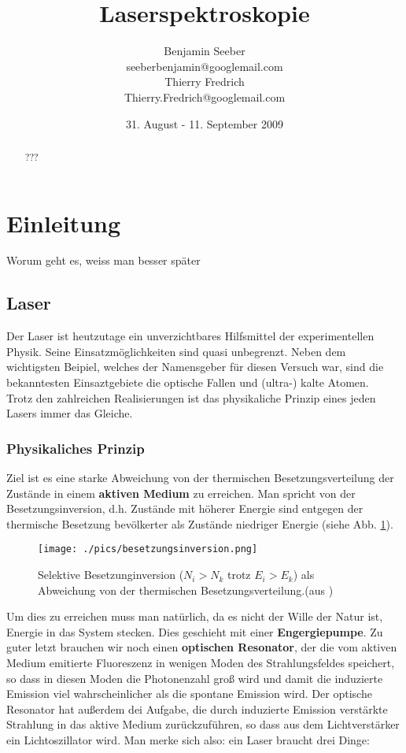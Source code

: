 \documentclass[a4paper,oneside]{article}
\title{Laserspektroskopie}
\author{
Benjamin Seeber\\
\vspace{25pt}
seeberbenjamin@googlemail.com\\
Thierry Fredrich\\
Thierry.Fredrich@googlemail.com
}
\date{31. August - 11. September 2009}
\begin{document}
\begin{titlepage}
  \maketitle
  \vfill
  \thispagestyle{empty}



\begin{abstract}
???
\end{abstract}
\end{titlepage}


\tableofcontents
\clearpage

\section{Einleitung}
Worum geht es, weiss man besser später
\subsection{Laser}
Der Laser ist heutzutage ein unverzichtbares Hilfsmittel der experimentellen Physik. Seine Einsatzmöglichkeiten sind quasi unbegrenzt. Neben dem wichtigsten Beipiel, welches der Namensgeber für diesen Versuch war, sind die bekanntesten Einsaztgebiete die optische Fallen und (ultra-) kalte Atomen. \\
Trotz den zahlreichen Realisierungen ist das physikaliche Prinzip eines jeden Lasers immer das Gleiche.
\subsubsection{Physikaliches Prinzip}
Ziel ist es eine starke Abweichung von der thermischen Besetzungsverteilung der Zustände in einem \textbf{aktiven Medium} zu erreichen. Man spricht von der Besetzungsinversion, d.h. Zustände mit höherer Energie sind entgegen der thermische Besetzung bevölkerter als Zustände niedriger Energie (siehe Abb. \ref{besetzungsinversion}).\\

\begin{figure}[!htb]
 \centering
 \texttt{[image: ./pics/besetzungsinversion.png]}
 \caption[Besetzungsinversion (aus \cite{dem3})]{Selektive Besetzunginversion ($N_i>N_k$ trotz $E_i>E_k$) als Abweichung von der thermischen Besetzungsverteilung.(aus \cite{dem3})}
 \label{besetzungsinversion}
\end{figure}
Um dies zu erreichen muss man natürlich, da es nicht der Wille der Natur ist, Energie in das System stecken. Dies geschieht mit einer \textbf{Engergiepumpe}. Zu guter letzt brauchen wir noch einen \textbf{optischen Resonator}, der die vom aktiven Medium emitierte Fluoreszenz in wenigen Moden des Strahlungsfeldes speichert, so dass in diesen Moden die Photonenzahl groß wird und damit die induzierte Emission viel wahrscheinlicher als die spontane Emission wird. Der optische Resonator hat außerdem dei Aufgabe, die durch induzierte Emission verstärkte Strahlung in das aktive Medium zurückzuführen, so dass aus dem Lichtverstärker ein Lichtoszillator wird.
Man merke sich also: ein Laser braucht drei Dinge:\\
\end{document}
